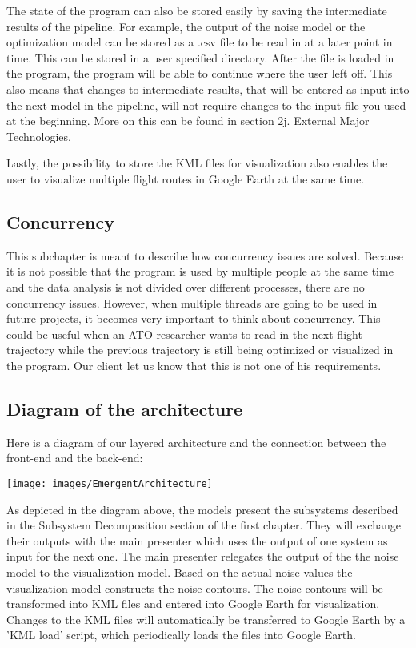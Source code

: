 The state of the program can also be stored easily by saving the intermediate results of the pipeline. For example, the output of the noise model or the optimization model can be stored as a .csv file to be read in at a later point in time. This can be stored in a user specified directory. After the file is loaded in the program, the program will be able to continue where the user left off. This also means that changes to intermediate results, that will be entered as input into the next model in the pipeline, will not require changes to the input file you used at the beginning. More on this can be found in section 2j. External Major Technologies.
 
Lastly, the possibility to store the KML files for visualization also enables the user to visualize multiple flight routes in Google Earth at the same time.

\subsection{Concurrency}
This subchapter is meant to describe how concurrency issues are solved. Because it is not possible that the program is used by multiple people at the same time and the data analysis is not divided over different processes, there are no concurrency issues. However, when multiple threads are going to be used in future projects, it becomes very important to think about concurrency. This could be useful when an ATO researcher wants to read in the next flight trajectory while the previous trajectory is still being optimized or visualized in the program. Our client let us know that this is not one of his requirements.

\newpage 

\subsection{Diagram of the architecture}

Here is a diagram of our layered architecture and the connection between the front-end and the back-end: \\

\begin{center}
\texttt{[image: images/EmergentArchitecture]} \\
\end{center}

As depicted in the diagram above, the models present the subsystems described in the Subsystem Decomposition section of the first chapter. They will exchange their outputs with the main presenter which uses the output of one system as input for the next one. The main presenter relegates the output of the the noise model to the visualization model. Based on the actual noise values the visualization model constructs the noise contours. The noise contours will be transformed into KML files and entered into Google Earth for visualization. Changes to the KML files will automatically be transferred to Google Earth by a 'KML load' script, which periodically loads the files into Google Earth.

